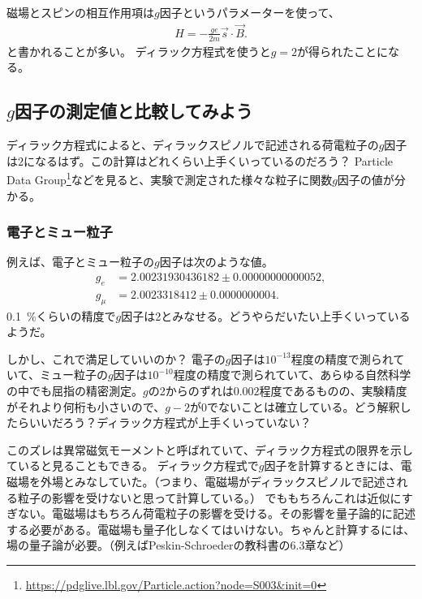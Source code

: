 \documentclass[10pt,a4paper]{jarticle}
\begin{document}
磁場とスピンの相互作用項は$g$因子というパラメーターを使って、
\begin{align}
H = -\frac{ge}{2m} \vec s \cdot \vec B.
\end{align}
と書かれることが多い。
ディラック方程式を使うと$g=2$が得られたことになる。

\subsection{$g$因子の測定値と比較してみよう}
ディラック方程式によると、ディラックスピノルで記述される荷電粒子の$g$因子は$2$になるはず。この計算はどれくらい上手くいっているのだろう？
Particle Data Group\footnote{\url{https://pdglive.lbl.gov/Particle.action?node=S003&init=0}}などを見ると、実験で測定された様々な粒子に関数$g$因子の値が分かる。

\subsubsection{電子とミュー粒子}
例えば、電子とミュー粒子の$g$因子は次のような値。
\begin{align}
g_e &= 2.00231930436182 \pm 
      0.00000000000052, \\
g_\mu &= 2.0023318412 \pm 
        0.0000000004.
\end{align}
0.1~\%くらいの精度で$g$因子は2とみなせる。どうやらだいたい上手くいっているようだ。

しかし、これで満足していいのか？
電子の$g$因子は$10^{-13}$程度の精度で測られていて、ミュー粒子の$g$因子は$10^{-10}$程度の精度で測られていて、あらゆる自然科学の中でも屈指の精密測定。$g$の2からのずれは$0.002$程度であるものの、実験精度がそれより何桁も小さいので、$g-2$が0でないことは確立している。どう解釈したらいいだろう？ディラック方程式が上手くいっていない？


このズレは異常磁気モーメントと呼ばれていて、ディラック方程式の限界を示していると見ることもできる。
ディラック方程式で$g$因子を計算するときには、電磁場を外場とみなしていた。（つまり、電磁場がディラックスピノルで記述される粒子の影響を受けないと思って計算している。）
でももちろんこれは近似にすぎない。電磁場はもちろん荷電粒子の影響を受ける。その影響を量子論的に記述する必要がある。電磁場も量子化しなくてはいけない。ちゃんと計算するには、場の量子論が必要。（例えばPeskin-Schroederの教科書の6.3章など）
\end{document}
